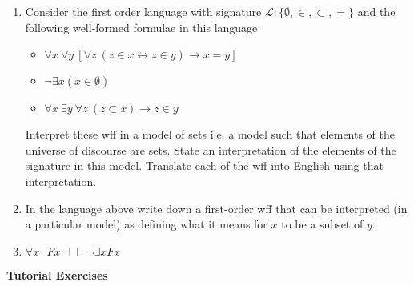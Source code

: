 \documentclass[11pt]{report}
\begin{document}
\begin{enumerate}
	\item Consider the first order language with signature $\mathcal{L}: \{\emptyset, \in, \subset, =\}$ and the following well-formed formulae in this language 
	
		\begin{itemize}
			\item $\forall x \ \forall y \ [\forall z \ (z \in x \leftrightarrow z \in y) \rightarrow x = y]$
			\item $\lnot \exists x (x \in \emptyset)$
			\item $\forall x \ \exists y \ \forall z \ (z \subset x) \rightarrow z \in y$
		\end{itemize}

	Interpret these wff in a model of sets i.e. a model such that elements of the universe of discourse are sets. State an interpretation of the elements of the signature in this model. Translate each of the wff into English using that interpretation. 

	\vspace{0.5cm}

	\item In the language above write down a first-order wff that can be interpreted (in a particular model) as defining what it means for $x$ to be a subset of $y$. 

	\vspace{0.5cm}

	\item $\forall x \neg Fx \dashv \vdash  \neg \exists x Fx$
\end{enumerate}
\newpage
{\bf Tutorial Exercises}
\end{document}
